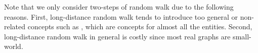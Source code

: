 Note that we only consider two-steps of random walk due to the following reasons.
First, long-distance random walk tends to introduce too general or non-related concepts such as , which are concepts for almost all the entities.
Second, long-distance random walk in general is costly since most real graphs are small-world.

%
%

%
%
%
%
%
%
%
%
%
